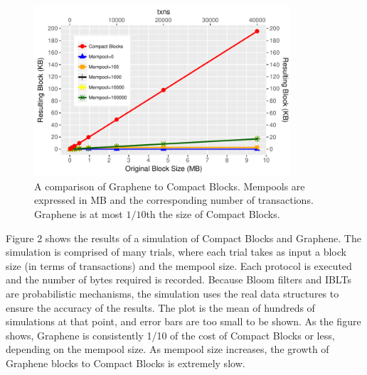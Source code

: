 \begin{figure}\begin{center}
	\includegraphics[width=0.85\textwidth]{graphs/graphene}
	\caption{A comparison of Graphene to Compact Blocks.
Mempools are expressed in MB and the corresponding number of transactions. Graphene is at most $1/10$th the size of Compact Blocks.  
	\label{fig:graphene}}
\end{center}\end{figure}

Figure 2 shows the results of a simulation of
Compact Blocks and Graphene. The simulation is comprised
of many trials, where each trial takes as input a block size (in terms
of transactions) and the mempool size. Each protocol is executed and the
number of bytes required is recorded. Because Bloom filters
and IBLTs are probabilistic mechanisms, the simulation uses
the real data structures to ensure the accuracy of the results.
The plot is the mean of hundreds of simulations
at that point, and error bars are too small to be shown.
As the figure shows, Graphene is consistently 1/10 of the
cost of Compact Blocks or less, depending on the mempool
size. As mempool size increases, the growth of Graphene blocks to Compact Blocks is extremely slow.

